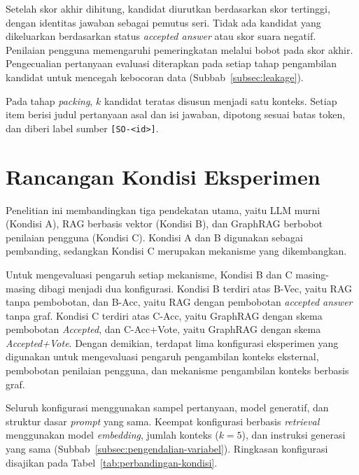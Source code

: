 Setelah skor akhir dihitung, kandidat diurutkan berdasarkan skor tertinggi, dengan identitas jawaban sebagai pemutus seri. Tidak ada kandidat yang dikeluarkan berdasarkan status \emph{accepted answer} atau skor suara negatif. Penilaian pengguna memengaruhi pemeringkatan melalui bobot pada skor akhir. Pengecualian pertanyaan evaluasi diterapkan pada setiap tahap pengambilan kandidat untuk mencegah kebocoran data (Subbab~\ref{subsec:leakage}).

Pada tahap \emph{packing}, $k$ kandidat teratas disusun menjadi satu konteks. Setiap item berisi judul pertanyaan asal dan isi jawaban, dipotong sesuai batas token, dan diberi label sumber \texttt{[SO-\textless id\textgreater]}.


\section{Rancangan Kondisi Eksperimen}
\label{sec:kondisi-eksperimen}

Penelitian ini membandingkan tiga pendekatan utama, yaitu LLM murni (Kondisi A), RAG berbasis vektor (Kondisi B), dan GraphRAG berbobot penilaian pengguna (Kondisi C). Kondisi A dan B digunakan sebagai pembanding, sedangkan Kondisi C merupakan mekanisme yang dikembangkan.

Untuk mengevaluasi pengaruh setiap mekanisme, Kondisi B dan C masing-masing dibagi menjadi dua konfigurasi. Kondisi B terdiri atas B-Vec, yaitu RAG tanpa pembobotan, dan B-Acc, yaitu RAG dengan pembobotan \emph{accepted answer} tanpa graf. Kondisi C terdiri atas C-Acc, yaitu GraphRAG dengan skema pembobotan \emph{Accepted}, dan C-Acc+Vote, yaitu GraphRAG dengan skema \emph{Accepted+Vote}. Dengan demikian, terdapat lima konfigurasi eksperimen yang digunakan untuk mengevaluasi pengaruh pengambilan konteks eksternal, pembobotan penilaian pengguna, dan mekanisme pengambilan konteks berbasis graf.

Seluruh konfigurasi menggunakan sampel pertanyaan, model generatif, dan struktur dasar \emph{prompt} yang sama. Keempat konfigurasi berbasis \emph{retrieval} menggunakan model \emph{embedding}, jumlah konteks ($k=5$), dan instruksi generasi yang sama (Subbab~\ref{subsec:pengendalian-variabel}). Ringkasan konfigurasi disajikan pada Tabel~\ref{tab:perbandingan-kondisi}.

